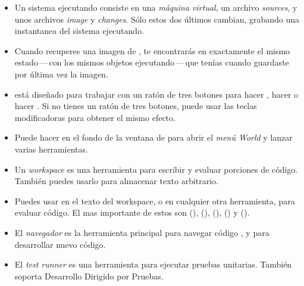 \documentclass[a4paper,10pt,twoside]{book}
\begin{document}
\begin{itemize}
  \item Un sistema \pharo ejecutando consiste en una \emph{m\'aquina virtual}, un archivo \emph{sources}, y unos archivos \emph{image} y \emph{changes}. S\'olo estos dos \'ultimos cambian, grabando una instantanea del sistema ejecutando.
  \item Cuando recuperes una imagen de \pharo, te encontrar\'as en exactamente el mismo estado\,---\,con los mismos objetos ejecutando\,---\,que ten\'ias cuando guardaste por \'ultima vez la imagen.
  \item \pharo est\'a diseñado para trabajar con un rat\'on de tres botones para hacer \click, hacer \actclick o hacer \metaclick. Si no tienes un rat\'on de tres botones, puede usar las teclas modificadoras para obtener el mismo efecto.
  \item Puede hacer \click en el fondo de la ventana de \pharo para abrir el \emph{men\'u World} y lanzar varias herramientas.
  \item Un \emph{workspace} es una herramienta para escribir y evaluar porciones de c\'odigo. Tambi\'en puedes usarlo para almacenar texto arbitrario.
  \item Puedes usar  en el texto del workspace, o en cualquier otra herramienta, para evaluar c\'odigo. El mas importante de estos son  (),  (),  (),  () y  ().
  \item El \emph{navegador} es la herramienta principal para navegar c\'odigo \pharo, y para desarrollar nuevo c\'odigo.
  \item El \emph{test runner} es una herramienta para ejecutar pruebas unitarias. Tambi\'en soporta Desarrollo Dirigido por Pruebas.
\end{itemize}

\ifx\wholebook\relax\else 
   
   
\end{document}
